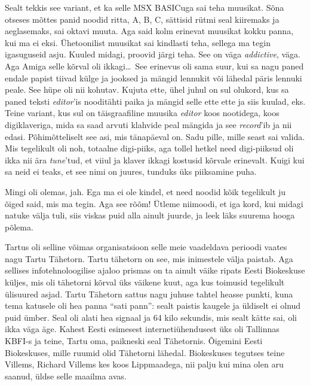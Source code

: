 Sealt tekkis see variant, et ka selle MSX BASICuga sai teha muusikat. Sõna otseses mõttes panid noodid ritta, A, B, C, sättisid 
rütmi seal kiiremaks ja aeglasemaks, sai oktavi muuta. Aga said 
kolm erinevat muusikat  kokku panna, kui ma ei eksi. Ühetoonilist muusikat sai 
kindlasti teha, sellega ma tegin igasuguseid asju. Kuuled midagi, proovid 
järgi teha. See on väga \emph{addictive},  väga. Aga Amiga selle kõrval oli 
ikkagi\ldots\ See erinevus oli sama suur, kui sa nagu paned endale  papist 
tiivad külge ja jooksed ja mängid lennukit või lähedal päris lennuki peale. See 
hüpe oli nii kohutav. Kujuta ette, ühel juhul on sul olukord, kus sa 
paned teksti \emph{editor}'is  nooditähti paika ja mängid selle ette ette ja 
siis kuulad, eks. Teine variant, kus sul on  täisgraafiline muusika 
\emph{editor} koos nootidega,  koos digiklaveriga, mida sa saad arvuti 
klahvide peal mängida ja see \emph{record}'ib ja nii edasi. Põhimõtteliselt 
see asi, mis tänapäeval on. Sadu pille, mille seast sai valida. Mis 
tegelikult oli noh, totaalne digi-piiks, aga tollel hetkel need digi-piiksud 
oli ikka nii ära \emph{tune}'tud, et viiul ja klaver ikkagi kostusid kõrvale 
erinevalt. Kuigi kui sa neid ei teaks, et see nimi on juures, tunduks  üks 
 piiksamine puha. 


Mingi oli olemas, jah. Ega ma ei ole kindel, et need noodid kõik tegelikult ju õiged 
said, mis ma tegin. Aga see rõõm! Ütleme niimoodi, et iga kord, kui midagi 
natuke välja tuli, siis viskas puid alla ainult juurde, ja  
leek läks suurema hooga põlema. 

Tartus oli selline  võimas 
organisatsioon selle meie  vaadeldava  perioodi vaates nagu Tartu 
Tähetorn.
Tartu tähetorn on see, mis inimestele välja paistab. Aga sellises 
infotehnoloogilise ajaloo prismas on ta ainult väike ripats  Eesti  
Biokeskuse 
küljes, mis oli tähetorni kõrval üks väikene kuut, aga kus toimusid tegelikult 
ülisuured asjad. Tartu Tähetorn sattus nagu juhuse tahtel  heasse 
punkti, kuna tema katusele oli hea panna \enquote{sati pann}: 
 sealt paistis kaugele ja üldiselt  ei olnud puid ümber. Seal oli alati 
hea signaal ja 64 kilo sekundis, mis sealt kätte sai, oli ikka väga äge. Kahest Eesti 
esimesest internetiühendusest üks oli Tallinnas KBFI-s ja teine, Tartu oma, paikneski 
seal Tähetornis. Õigemini Eesti Biokeskuses, mille ruumid olid Tähetorni 
lähedal. Biokeskuses tegutses teine Villems, Richard Villems kes koos Lippmaadega, nii palju kui mina olen aru saanud, üldse selle  
maailma avas.

